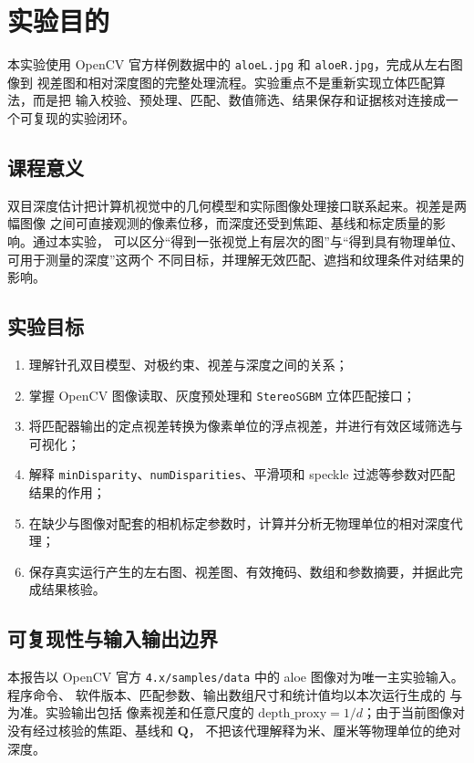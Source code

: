 \section{实验目的}

本实验使用 OpenCV 官方样例数据中的 \texttt{aloeL.jpg} 和 \texttt{aloeR.jpg}，完成从左右图像到
视差图和相对深度图的完整处理流程。实验重点不是重新实现立体匹配算法，而是把
输入校验、预处理、匹配、数值筛选、结果保存和证据核对连接成一个可复现的实验闭环。

\subsection{课程意义}

双目深度估计把计算机视觉中的几何模型和实际图像处理接口联系起来。视差是两幅图像
之间可直接观测的像素位移，而深度还受到焦距、基线和标定质量的影响。通过本实验，
可以区分“得到一张视觉上有层次的图”与“得到具有物理单位、可用于测量的深度”这两个
不同目标，并理解无效匹配、遮挡和纹理条件对结果的影响。

\subsection{实验目标}

\begin{enumerate}
  \item 理解针孔双目模型、对极约束、视差与深度之间的关系；
  \item 掌握 OpenCV 图像读取、灰度预处理和 \texttt{StereoSGBM} 立体匹配接口；
  \item 将匹配器输出的定点视差转换为像素单位的浮点视差，并进行有效区域筛选与可视化；
  \item 解释 \texttt{minDisparity}、\texttt{numDisparities}、平滑项和 speckle 过滤等参数对匹配结果的作用；
  \item 在缺少与图像对配套的相机标定参数时，计算并分析无物理单位的相对深度代理；
  \item 保存真实运行产生的左右图、视差图、有效掩码、数组和参数摘要，并据此完成结果核验。
\end{enumerate}

\subsection{可复现性与输入输出边界}

本报告以 OpenCV 官方 \texttt{4.x/samples/data} 中的 aloe 图像对为唯一主实验输入。程序命令、
软件版本、匹配参数、输出数组尺寸和统计值均以本次运行生成的
 与  为准。实验输出包括
像素视差和任意尺度的
\(\mathrm{depth\_proxy}=1/d\)；由于当前图像对没有经过核验的焦距、基线和 $\mathbf{Q}$，
不把该代理解释为米、厘米等物理单位的绝对深度。

